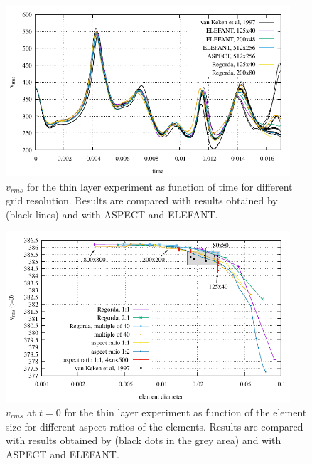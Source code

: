 \documentclass[hidelinks,11pt,a4paper]{article}
\begin{document}
\begin{figure}
\centering
\noindent\includegraphics[width=400px]{./Figures/vrms_thin.pdf}
\caption{$v_{rms}$ for the thin layer experiment as function of time for different grid resolution. Results are compared with results obtained by \citet{vanKeken1997} (black lines) and with ASPECT and ELEFANT.}
\label{fig:thin}
\end{figure}

\begin{figure}
\centering
\noindent\includegraphics[width=400px]{./Figures/vrmszero.pdf}
\caption{$v_{rms}$ at $t=0$ for the thin layer experiment as function of the element size for different aspect ratios of the elements. Results are compared with results obtained by \citet{vanKeken1997} (black dots in the grey area) and with ASPECT and ELEFANT.}
\label{fig:thin_initial}
\end{figure}
\end{document}
